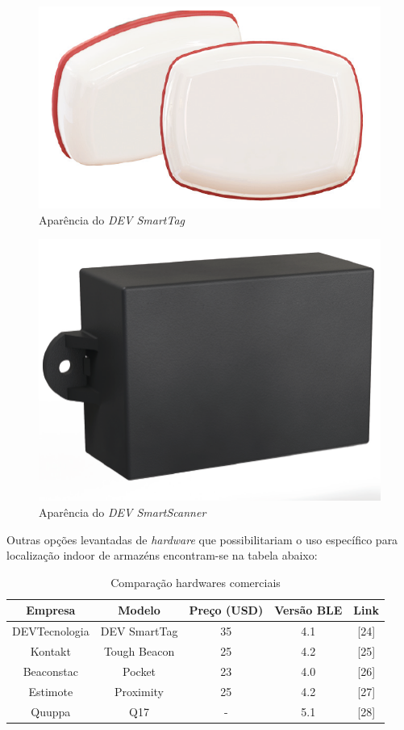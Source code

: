 \begin{figure}[H]
	\centering
	\includegraphics[scale = 1]{images/dev_tag.png}
	\caption{Aparência do \textit{DEV SmartTag}}
	\label{fig:dev_smart_tag}
\end{figure}

\begin{figure}[H]
	\centering
	\includegraphics[scale = 1]{images/dev_scanner.png}
	\caption{Aparência do \textit{DEV SmartScanner}}
	\label{fig:dev_smart_scanner}
\end{figure}

Outras opções levantadas de \textit{hardware} que possibilitariam o uso específico para localização indoor de armazéns encontram-se na tabela abaixo:

\begin{table}[H]
    \centering
    \begin{tabular}{||c c c c c||}
    \hline
    Empresa & Modelo & Preço (USD) & Versão BLE & Link \\ [0.5ex]
    \hline\hline
    DEVTecnologia & DEV SmartTag & 35 & 4.1 & [24]\\
    \hline
    Kontakt & Tough Beacon & 25  & 4.2 & [25]\\
    \hline
    Beaconstac & Pocket & 23  & 4.0 & [26] \\
    \hline
    Estimote & Proximity & 25 & 4.2 & [27]\\
    \hline
    Quuppa & Q17 & -  & 5.1 & [28] \\ [0.5ex]
    \hline
    \end{tabular}
    \caption{Comparação hardwares comerciais}
    \label{tab: Tabela Comercial}
\end{table}


